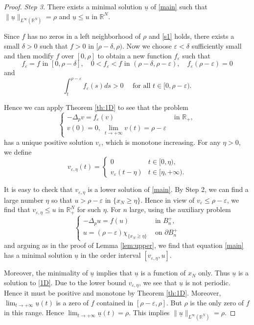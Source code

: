 \documentclass[reqno]{amsart}
\theoremstyle{plain}
\theoremstyle{definition}
\theoremstyle{remark}
\begin{document}
\begin{proof}
		\textit{Step 3.} There exists a minimal solution $\underline u$ of \eqref{main} such that $\|\underline u\|_{L^\infty(\mathbb{R}^N)}=\rho$ and $\underline u \le u$ in $\mathbb{R}^N$.
		
		Since $f$ has no zeros in a left neighborhood of $\rho$ and \eqref{s1} holds, there exists a small $\delta > 0$ such that $f > 0$ in $[\rho - \delta, \rho)$. Now we choose $\varepsilon<\delta$ sufficiently small and then modify $f$ over $[0, \rho]$ to obtain a new function $f_\varepsilon$ such that
		\[
		f_\varepsilon = f \text{ in } [0, \rho-\delta],\quad
		0<f_\varepsilon<f \text{ in } (\rho-\delta,\rho-\varepsilon),\quad
		f_\varepsilon(\rho-\varepsilon)=0
		\]
		and
		\[
		\int_{t}^{\rho-\varepsilon} f_\varepsilon(s) ds > 0 \quad\text{ for all } t\in[0, \rho-\varepsilon).
		\]
		
		Hence we can apply Theorem \ref{th:1D} to see that the problem
		\[
		\begin{cases}
			-\Delta_p v = f_\varepsilon(v) & \text{ in } \mathbb{R}_+,\\
			v(0)=0,~ \lim_{t\to+\infty} v(t) = \rho-\varepsilon
		\end{cases}
		\]
		has a unique positive solution $v_\varepsilon$, which is monotone increasing. For any $\eta>0$, we define
		\[
		v_{\varepsilon,\eta}(t) =
		\begin{cases}
			0 & t \in [0,\eta),\\
			v_\varepsilon(t-\eta) & t \in [\eta,+\infty).
		\end{cases}
		\]
		
		It is easy to check that $v_{\varepsilon,\eta}$ is a lower solution of \eqref{main}. By Step 2, we can find a large number $\eta$ so that $u>\rho-\varepsilon$ in $\{x_N\ge \eta\}$. Hence in view of $v_\varepsilon\le \rho-\varepsilon$, we find that $v_{\varepsilon,\eta}\le u$ in $\mathbb{R}^N_+$ for such $\eta$. For $n$ large, using the auxiliary problem
		\[
		\begin{cases}
			-\Delta_p u = f(u) &\text{ in } B_n^+,\\
			u = (\rho-\varepsilon)\chi_{\{x_N\ge\eta\}} &\text{ on } \partial B_n^+
		\end{cases}
		\]
		and arguing as in the proof of Lemma \ref{lem:upper}, we find that equation \eqref{main} has a minimal solution $\underline u$ in the order interval $[v_{\varepsilon,\eta}, u]$.
		
		Moreover, the minimality of $\underline u$ implies that $\underline u$ is a function of $x_N$ only. Thus $\underline u$ is a solution to \eqref{1D}. Due to the lower bound $v_{\varepsilon,\eta}$, we see that $\underline u$ is not periodic. Hence it must be positive and monotone by Theorem \ref{th:1D}. Moreover, $\lim_{t\to+\infty} \underline u(t)$ is a zero of $f$ contained in $[\rho-\varepsilon,\rho]$. But $\rho$ is the only zero of $f$ in this range. Hence $\lim_{t\to+\infty} \underline u(t)=\rho$. This implies $\|\underline u\|_{L^\infty(\mathbb{R}^N)}=\rho$.
	\end{proof}
	
\end{document}
